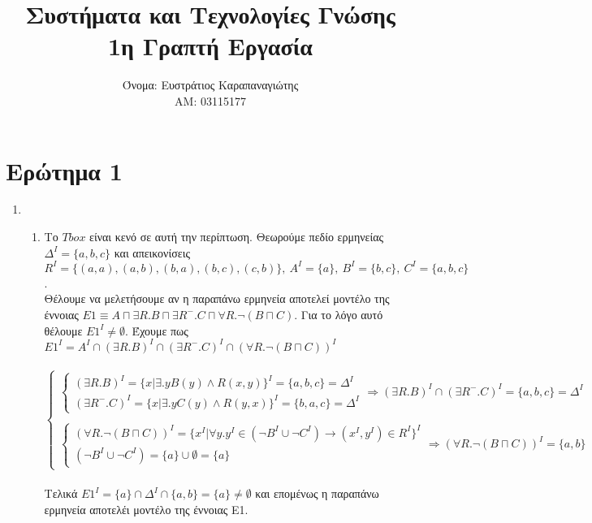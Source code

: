 \documentclass[10pt]{article}
\title{Συστήματα και Τεχνολογίες Γνώσης\\ \small{1η Γραπτή Εργασία}}
\author{Όνομα: Ευστράτιος Καραπαναγιώτης\\ \small{ΑΜ: 03115177}}
\begin{document}
\maketitle
\section*{Ερώτημα 1}

\begin{enumerate}
\item
\begin{enumerate}
\item Το $Tbox$ είναι κενό σε αυτή την περίπτωση. Θεωρούμε πεδίο ερμηνείας $\Delta^{I} = \{a, b, c\}$ και απεικονίσεις \\$R^{I} = \{(a, a), (a, b), (b, a), (b, c), (c, b)\}, \ A^{I} = \{a\}, \ B^{I} = \{b, c\}, \ C^{I} = \{a, b, c\}$.
\\
Θέλουμε να μελετήσουμε αν η παραπάνω ερμηνεία αποτελεί μοντέλο της έννοιας $E1 \equiv A \sqcap \exists R.B \sqcap \exists R^{-}.C \sqcap \forall R.\neg(B \sqcap C)$. Για το λόγο αυτό θέλουμε $E1^I \neq \emptyset$. Έχουμε πως $E1^I = A^I \cap (\exists R.B)^{I} \cap (\exists R^{-}.C)^{I} \cap (\forall R.\neg(B \sqcap C))^{I}$
\\\\
$
\begin{cases}
\begin{cases}
(\exists R.B)^{I} = \{x | \exists. y B(y) \land R(x, y)\}^{I} = \{a, b, c\} = \Delta^{I}
\\
(\exists R^{-}.C)^{I} = \{x | \exists. y C(y) \land R(y, x)\}^{I} = \{b, a, c\} = \Delta^{I}
\end{cases}
\Rightarrow (\exists R.B)^{I} \cap (\exists R^{-}.C)^{I} = \{a, b, c\} = \Delta^{I}
\\\\
\begin{cases}
(\forall R.\neg(B \sqcap C))^{I} = \{x^I | \forall y. y^I \in (\neg B^I \cup \neg C^I) \rightarrow (x^I, y^I) \in R^I\}^I
\\
(\neg B^I \cup \neg C^I) = \{a\} \cup \emptyset = \{a\}
\end{cases}
\Rightarrow (\forall R.\neg(B \sqcap C))^{I} = \{a, b\}
\end{cases}
$
\\\\
Τελικά $E1^I = \{a\} \cap \Delta^I \cap \{a, b\} = \{a\} \neq \emptyset$ και επομένως η παραπάνω ερμηνεία αποτελέι μοντέλο της έννοιας E1.


\end{enumerate}
\end{enumerate}
\end{document}
